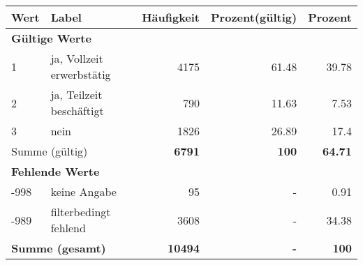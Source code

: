      \begin{longtable}{lXrrr}
     \toprule
     \textbf{Wert} & \textbf{Label} & \textbf{Häufigkeit} & \textbf{Prozent(gültig)} & \textbf{Prozent} \\
     \endhead
     \midrule
     \multicolumn{5}{l}{\textbf{Gültige Werte}}\\

     1 &
     \multicolumn{1}{X}{ ja, Vollzeit erwerbstätig   } &


       \num{4175} &
       \num[round-mode=places,round-precision=2]{61.48} &
         \num[round-mode=places,round-precision=2]{39.78} \\

     2 &
     \multicolumn{1}{X}{ ja, Teilzeit beschäftigt   } &


       \num{790} &
       \num[round-mode=places,round-precision=2]{11.63} &
         \num[round-mode=places,round-precision=2]{7.53} \\

     3 &
     \multicolumn{1}{X}{ nein   } &


       \num{1826} &
       \num[round-mode=places,round-precision=2]{26.89} &
         \num[round-mode=places,round-precision=2]{17.4} \\
     \midrule
     \multicolumn{2}{l}{Summe (gültig)} &
       \textbf{\num{6791}} &
     \textbf{\num{100}} &
       \textbf{\num[round-mode=places,round-precision=2]{64.71}} \\
     \multicolumn{5}{l}{\textbf{Fehlende Werte}}\\
       -998 &
       keine Angabe &
         \num{95} &
        - &
         \num[round-mode=places,round-precision=2]{0.91} \\
       -989 &
       filterbedingt fehlend &
         \num{3608} &
        - &
         \num[round-mode=places,round-precision=2]{34.38} \\
     \midrule
     \multicolumn{2}{l}{\textbf{Summe (gesamt)}} &
          \textbf{\num{10494}} &
        \textbf{-} &
        \textbf{\num{100}} \\
     \bottomrule
     \end{longtable}
     
